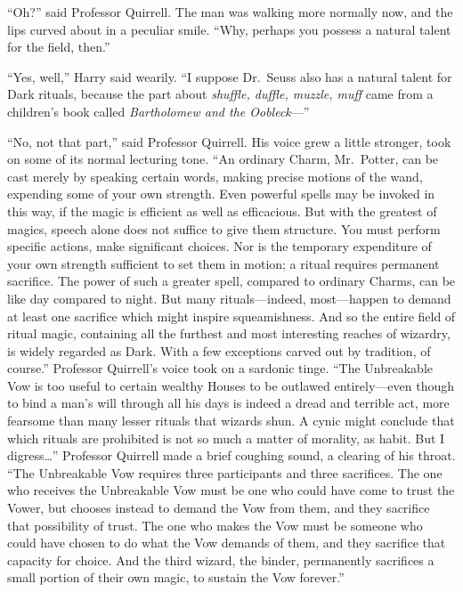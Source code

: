``Oh?'' said Professor Quirrell. The man was walking more normally now,
and the lips curved about in a peculiar smile. ``Why, perhaps you
possess a natural talent for the field, then.''

``Yes, well,'' Harry said wearily. ``I suppose Dr.~Seuss also has a
natural talent for Dark rituals, because the part about \emph{shuffle,
duffle, muzzle, muff} came from a children's book called
\emph{Bartholomew and the Oobleck}---''

``No, not that part,'' said Professor Quirrell. His voice grew a little
stronger, took on some of its normal lecturing tone. ``An ordinary
Charm, Mr.~Potter, can be cast merely by speaking certain words, making
precise motions of the wand, expending some of your own strength. Even
powerful spells may be invoked in this way, if the magic is efficient as
well as efficacious. But with the greatest of magics, speech alone does
not suffice to give them structure. You must perform specific actions,
make significant choices. Nor is the temporary expenditure of your own
strength sufficient to set them in motion; a ritual requires permanent
sacrifice. The power of such a greater spell, compared to ordinary
Charms, can be like day compared to night. But many rituals---indeed,
most---happen to demand at least one sacrifice which might inspire
squeamishness. And so the entire field of ritual magic, containing all
the furthest and most interesting reaches of wizardry, is widely
regarded as Dark. With a few exceptions carved out by tradition, of
course.'' Professor Quirrell's voice took on a sardonic tinge. ``The
Unbreakable Vow is too useful to certain wealthy Houses to be outlawed
entirely---even though to bind a man's will through all his days is
indeed a dread and terrible act, more fearsome than many lesser rituals
that wizards shun. A cynic might conclude that which rituals are
prohibited is not so much a matter of morality, as habit. But I
digress\ldots{}'' Professor Quirrell made a brief coughing sound, a
clearing of his throat. ``The Unbreakable Vow requires three
participants and three sacrifices. The one who receives the Unbreakable
Vow must be one who could have come to trust the Vower, but chooses
instead to demand the Vow from them, and they sacrifice that possibility
of trust. The one who makes the Vow must be someone who could have
chosen to do what the Vow demands of them, and they sacrifice that
capacity for choice. And the third wizard, the binder, permanently
sacrifices a small portion of their own magic, to sustain the Vow
forever.''

